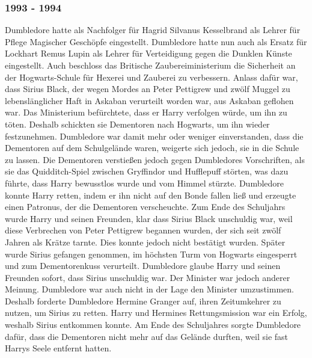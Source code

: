 \documentclass[a4paper, 10pt]{article}
\begin{document}
\subsubsection*{1993 - 1994}
Dumbledore hatte als Nachfolger für Hagrid Silvanus Kesselbrand als Lehrer für Pflege Magischer Geschöpfe eingestellt. Dumbledore hatte nun auch als Ersatz für Lockhart Remus Lupin als Lehrer für Verteidigung gegen die Dunklen Künste eingestellt. Auch beschloss das Britische Zaubereiministerium die Sicherheit an der Hogwarts-Schule für Hexerei und Zauberei zu verbessern. Anlass dafür war, dass Sirius Black, der wegen Mordes an Peter Pettigrew und zwölf Muggel zu lebenslänglicher Haft in Askaban verurteilt worden war, aus Askaban geflohen war. Das Ministerium befürchtete, dass er Harry verfolgen würde, um ihn zu töten. Deshalb schickten sie Dementoren nach Hogwarts, um ihn wieder festzunehmen. Dumbledore war damit mehr oder weniger einverstanden, dass die Dementoren auf dem Schulgelände waren, weigerte sich jedoch, sie in die Schule zu lassen.
\vspace{10pt}
\newline
Die Dementoren verstießen jedoch gegen Dumbledores Vorschriften, als sie das Quidditch-Spiel zwischen Gryffindor und Hufflepuff störten, was dazu führte, dass Harry bewusstlos wurde und vom Himmel stürzte. Dumbledore konnte Harry retten, indem er ihn nicht auf den Bonde fallen ließ und erzeugte einen Patronus, der die Dementoren verscheuchte.
\vspace{10pt}
\newline
Zum Ende des Schuljahrs wurde Harry und seinen Freunden, klar dass Sirius Black unschuldig war, weil diese Verbrechen von Peter Pettigrew begannen wurden, der sich seit zwölf Jahren als Krätze tarnte. Dies konnte jedoch nicht bestätigt wurden. Später wurde Sirius gefangen genommen, im höchsten Turm von Hogwarts eingesperrt und zum Dementorenkuss verurteilt. Dumbledore glaube Harry und seinen Freunden sofort, dass Sirius unschuldig war. Der Minister war jedoch anderer Meinung. Dumbledore war auch nicht in der Lage den Minister umzustimmen.
\vspace{10pt}
\newline
Deshalb forderte Dumbledore Hermine Granger auf, ihren Zeitumkehrer zu nutzen, um Sirius zu retten. Harry und Hermines Rettungsmission war ein Erfolg, weshalb Sirius entkommen konnte. Am Ende des Schuljahres sorgte Dumbledore dafür, dass die Dementoren nicht mehr auf das Gelände durften, weil sie fast Harrys Seele entfernt hatten.
\vspace{10pt}
\end{document}
